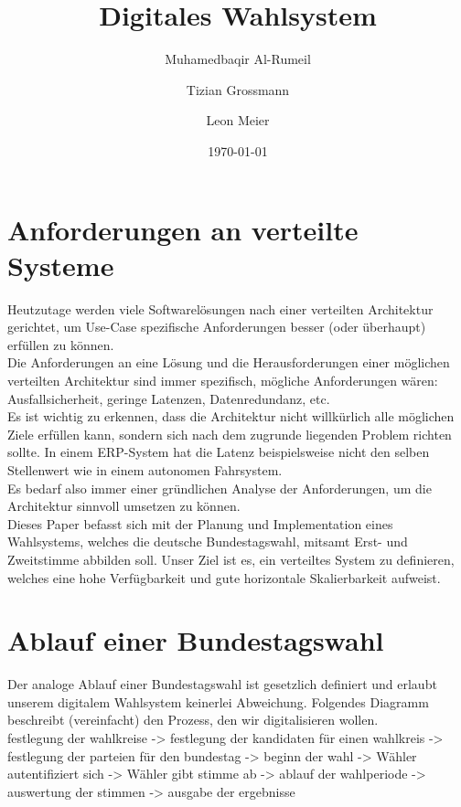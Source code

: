 \documentclass{article}  %
\title{Digitales Wahlsystem}
\author{
    Muhamedbaqir Al-Rumeil \and 
    Tizian Grossmann \and 
    Leon Meier
    }
\date{\today}  %
\begin{document}
\maketitle
\newpage

\tableofcontents
\newpage

\section{Anforderungen an verteilte Systeme}

Heutzutage werden viele Softwarelösungen nach einer verteilten Architektur gerichtet, um Use-Case spezifische Anforderungen besser (oder überhaupt) erfüllen zu können. \\
Die Anforderungen an eine Lösung und die Herausforderungen einer möglichen verteilten Architektur sind immer spezifisch, mögliche Anforderungen wären: Ausfallsicherheit, geringe Latenzen, Datenredundanz, etc.  \\

Es ist wichtig zu erkennen, dass die Architektur nicht willkürlich alle möglichen Ziele erfüllen kann, sondern sich nach dem zugrunde liegenden Problem richten sollte. In einem ERP-System hat die Latenz beispielsweise nicht den selben Stellenwert wie in einem autonomen Fahrsystem. \\
Es bedarf also immer einer gründlichen Analyse der Anforderungen, um die Architektur sinnvoll umsetzen zu können. \\


Dieses Paper befasst sich mit der Planung und Implementation eines Wahlsystems, welches die deutsche Bundestagswahl, mitsamt Erst- und Zweitstimme abbilden soll. Unser Ziel ist es, ein verteiltes System zu definieren, welches eine hohe Verfügbarkeit und gute horizontale Skalierbarkeit aufweist.
  
\newpage

\section{Ablauf einer Bundestagswahl}
Der analoge Ablauf einer Bundestagswahl ist gesetzlich definiert und erlaubt unserem digitalem Wahlsystem keinerlei Abweichung. Folgendes Diagramm beschreibt (vereinfacht) den Prozess, den wir digitalisieren wollen. \\

festlegung der wahlkreise -> festlegung der kandidaten für einen wahlkreis -> festlegung der parteien für den bundestag -> beginn der wahl -> Wähler autentifiziert sich -> Wähler gibt stimme ab -> ablauf der wahlperiode -> auswertung der stimmen -> ausgabe der ergebnisse
\end{document}
